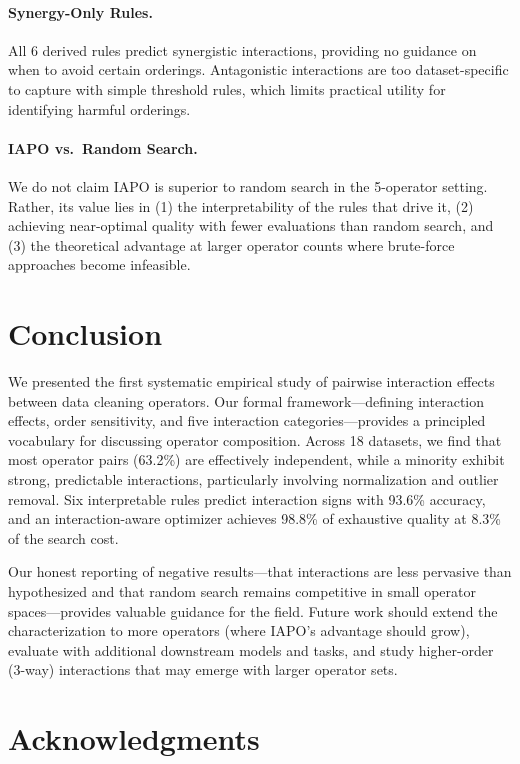 \documentclass[preprint]{article}
\begin{document}
\paragraph{Synergy-Only Rules.} All 6 derived rules predict synergistic interactions, providing no guidance on when to avoid certain orderings. Antagonistic interactions are too dataset-specific to capture with simple threshold rules, which limits practical utility for identifying harmful orderings.

\paragraph{IAPO vs.\ Random Search.} We do not claim IAPO is superior to random search in the 5-operator setting. Rather, its value lies in (1) the interpretability of the rules that drive it, (2) achieving near-optimal quality with fewer evaluations than random search, and (3) the theoretical advantage at larger operator counts where brute-force approaches become infeasible.

\section{Conclusion}
\label{sec:conclusion}

We presented the first systematic empirical study of pairwise interaction effects between data cleaning operators. Our formal framework---defining interaction effects, order sensitivity, and five interaction categories---provides a principled vocabulary for discussing operator composition. Across 18 datasets, we find that most operator pairs (63.2\%) are effectively independent, while a minority exhibit strong, predictable interactions, particularly involving normalization and outlier removal. Six interpretable rules predict interaction signs with 93.6\% accuracy, and an interaction-aware optimizer achieves 98.8\% of exhaustive quality at 8.3\% of the search cost.

Our honest reporting of negative results---that interactions are less pervasive than hypothesized and that random search remains competitive in small operator spaces---provides valuable guidance for the field. Future work should extend the characterization to more operators (where IAPO's advantage should grow), evaluate with additional downstream models and tasks, and study higher-order (3-way) interactions that may emerge with larger operator sets.

\section*{Acknowledgments}
\end{document}

